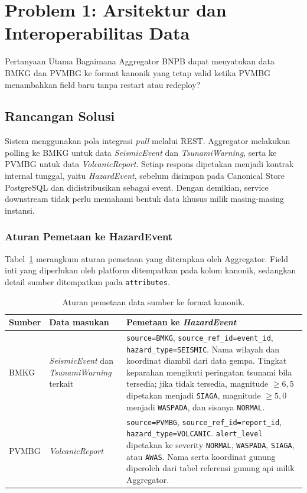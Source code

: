 \section{Problem 1: Arsitektur dan Interoperabilitas Data}
\begin{infobox}{Pertanyaan Utama}
Bagaimana Aggregator BNPB dapat menyatukan data BMKG dan PVMBG ke format
kanonik yang tetap valid ketika PVMBG menambahkan field baru tanpa restart
atau redeploy?
\end{infobox}

\subsection{Rancangan Solusi}
Sistem menggunakan pola integrasi \textit{pull} melalui REST. Aggregator
melakukan polling ke BMKG untuk data \textit{SeismicEvent} dan
\textit{TsunamiWarning}, serta ke PVMBG untuk data \textit{VolcanicReport}.
Setiap respons dipetakan menjadi kontrak internal tunggal, yaitu
\textit{HazardEvent}, sebelum disimpan pada Canonical Store PostgreSQL dan
didistribusikan sebagai event. Dengan demikian, service downstream tidak perlu
memahami bentuk data khusus milik masing-masing instansi.

\subsubsection{Aturan Pemetaan ke HazardEvent}
Tabel~\ref{tab:problem-satu-mapping} merangkum aturan pemetaan yang diterapkan
oleh Aggregator. Field inti yang diperlukan oleh platform ditempatkan pada
kolom kanonik, sedangkan detail sumber ditempatkan pada \texttt{attributes}.

\begin{table}[H]
  \centering
  \small
  \begin{tabularx}{\textwidth}{p{2.3cm}XX}
    \toprule
    Sumber & Data masukan & Pemetaan ke \textit{HazardEvent} \\
    \midrule
    BMKG & \textit{SeismicEvent} dan \textit{TsunamiWarning} terkait &
    \texttt{source=BMKG}, \texttt{source\_ref\_id=event\_id},
    \texttt{hazard\_type=SEISMIC}. Nama wilayah dan koordinat diambil dari
    data gempa. Tingkat keparahan mengikuti peringatan tsunami bila tersedia;
    jika tidak tersedia, magnitude $\geq 6{,}5$ dipetakan menjadi
    \texttt{SIAGA}, magnitude $\geq 5{,}0$ menjadi \texttt{WASPADA}, dan
    sisanya \texttt{NORMAL}. \\
    \addlinespace
    PVMBG & \textit{VolcanicReport} &
    \texttt{source=PVMBG}, \texttt{source\_ref\_id=report\_id},
    \texttt{hazard\_type=VOLCANIC}. \texttt{alert\_level} dipetakan ke
    severity \texttt{NORMAL}, \texttt{WASPADA}, \texttt{SIAGA}, atau
    \texttt{AWAS}. Nama serta koordinat gunung diperoleh dari tabel referensi
    gunung api milik Aggregator. \\
    \bottomrule
  \end{tabularx}
  \caption{Aturan pemetaan data sumber ke format kanonik.}
  \label{tab:problem-satu-mapping}
\end{table}

